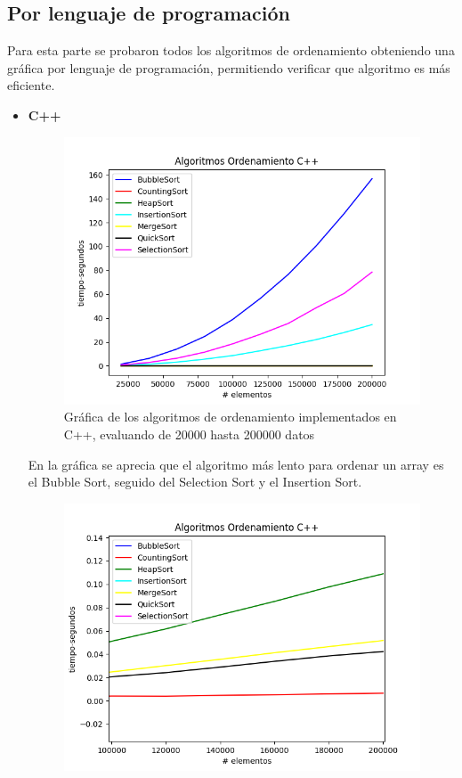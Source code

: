 \subsection*{Por lenguaje de programación}
Para esta parte se probaron todos los algoritmos de ordenamiento obteniendo una gráfica por lenguaje de programación, permitiendo verificar que algoritmo es más eficiente.
\begin{itemize}
    \item \textbf{C++}
        \begin{figure}[H]
	        \centering
	        \includegraphics[scale=0.5]{Practica01/images/plots/Sorts_C++.png}
	        \caption{Gráfica de los algoritmos de ordenamiento implementados en C++, evaluando de 20000 hasta 200000 datos}
		\end{figure}
En la gráfica se aprecia que el algoritmo más lento para ordenar un array es el Bubble Sort, seguido del Selection Sort y el Insertion Sort.
        \begin{figure}[H]
	        \centering
	        \includegraphics[scale=0.5]{Practica01/images/plots/Sorts2_C++.png}

\end{figure}
\end{itemize}
